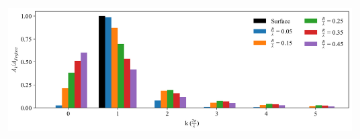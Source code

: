 \begin{figure}[ht]
\centering

    \begin{subfigure}[t]{1\textwidth}
        \centering
        \caption{\label{fig: Wave-Fourier}}
        \includegraphics[width=1\linewidth]{Figures/Wave-Fourier1.png}
    \end{subfigure}
    
    \hfill
    

\end{figure}

